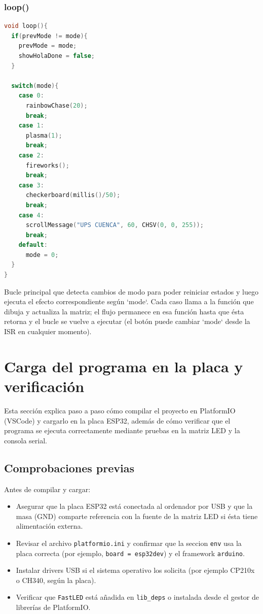\documentclass[a4paper,12pt]{article}
\begin{document}
\newpage

\subsubsection{loop()}

\begin{lstlisting}[language=C++, caption={Bucle principal loop}]
void loop(){
  if(prevMode != mode){
    prevMode = mode;
    showHolaDone = false;
  }

  switch(mode){
    case 0:
      rainbowChase(20);
      break;
    case 1:
      plasma(1);
      break;
    case 2:
      fireworks();
      break;
    case 3:
      checkerboard(millis()/50);
      break;
    case 4:
      scrollMessage("UPS CUENCA", 60, CHSV(0, 0, 255));
      break;
    default:
      mode = 0;
  }
}
\end{lstlisting}

Bucle principal que detecta cambios de modo para poder reiniciar estados y luego ejecuta el efecto correspondiente según `mode`. Cada caso llama a la función que dibuja y actualiza la matriz; el flujo permanece en esa función hasta que ésta retorna y el bucle se vuelve a ejecutar (el botón puede cambiar `mode` desde la ISR en cualquier momento).


\section{Carga del programa en la placa y verificación}

Esta sección explica paso a paso cómo compilar el proyecto en PlatformIO (VSCode) y cargarlo en la placa ESP32, además de cómo verificar que el programa se ejecuta correctamente mediante pruebas en la matriz LED y la consola serial.

\subsection{Comprobaciones previas}
Antes de compilar y cargar:
\begin{itemize}
  \item Asegurar que la placa ESP32 está conectada al ordenador por USB y que la masa (GND) comparte referencia con la fuente de la matriz LED si ésta tiene alimentación externa.
  \item Revisar el archivo \texttt{platformio.ini} y confirmar que la seccion \texttt{env} usa la placa correcta (por ejemplo, \texttt{board = esp32dev}) y el framework \texttt{arduino}.
  \item Instalar drivers USB si el sistema operativo los solicita (por ejemplo CP210x o CH340, según la placa).
  \item Verificar que \texttt{FastLED} está añadida en \texttt{lib\_deps} o instalada desde el gestor de librerías de PlatformIO.
\end{itemize}
\end{document}
